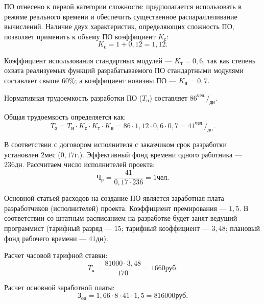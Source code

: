 ПО отнесено к первой категории сложности: предполагается использовать в режиме реального времени и обеспечить существенное распараллеливание вычислений. Наличие двух характеристик, определяющих сложность ПО, позволяет применить к объему ПО коэффициент \( K_{\text{с}} \):
\begin{displaymath}
  K_{\text{с}} = 1 + 0,12 = 1,12.
\end{displaymath}

Коэффициент использования стандартных модулей --- \( K_{\text{т}} = 0,6 \), так как степень охвата реализуемых функций разрабатываемого ПО стандартными модулями составляет свыше \( 60\% \); а коэффициент новизны ПО --- \( K_{\text{н}} = 0,7 \).

Нормативная трудоемкость разработки ПО (\( T_{\text{н}} \)) составляет \( 86 ^{\text{чел.}}/_{\text{дн}} \).

Общая трудоемкость определяется как:
\begin{displaymath}
  T_{\text{о}} = T_{\text{н}} \cdot K_{\text{с}} \cdot K_{\text{т}} \cdot K_{\text{н}} = 86 \cdot 1,12 \cdot 0,6 \cdot 0,7 = 41 ^{\text{чел.}}/_{\text{дн}}.
\end{displaymath}

В соответствии с договором исполнителя с заказчиком срок разработки установлен \( 2 \text{мес} \) (\( 0,17 \text{г.} \)). Эффективный фонд времени одного работника --- \( 236 \text{дн.} \) Рассчитаем число исполнителей проекта:
\begin{displaymath}
  \text{Ч}_{\text{р}} = \frac{41}{0,17 \cdot 236} = 1 \text{чел}.
\end{displaymath}

Основной статьей расходов на создание ПО является заработная плата разработчиков (исполнителей) проекта. Коэффициент премирования --- \( 1,5 \). В соответствии со штатным расписанием на разработке будет занят ведущий программист (тарифный разряд --- \( 15 \); тарифный коэффициент --- \( 3,48 \); плановый фонд рабочего времени --- \( 41 \text{дн} \)).

Расчет часовой тарифной ставки:
\begin{displaymath}
  T_{\text{ч}} = \frac{81000 \cdot 3,48}{170} = 1660 \text{руб}.
\end{displaymath}

Расчет основной заработной платы:
\begin{displaymath}
  \text{З}_{\text{ои}} = 1,66 \cdot 8 \cdot 41 \cdot 1,5 = 816000 \text{руб}.
\end{displaymath}

